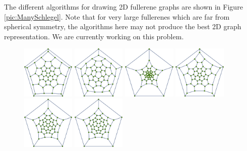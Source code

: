 \documentclass[article,a4paper,twoside]{memoir}
\begin{document}
The different algorithms for drawing 2D fullerene graphs are shown in Figure \ref{pic:ManySchlegel}. Note that for very large
fullerenes which are far from spherical symmetry, the algorithms here may not produce the best 2D graph representation.
We are currently working on this problem.

 \begin{figure}[htbp]
	\centering
  		 \includegraphics[width=0.225\textwidth]{Graph1.png}
		 \includegraphics[width=0.225\textwidth]{Graph2.png}
		 \includegraphics[width=0.225\textwidth]{Graph3.png}
		 \includegraphics[width=0.225\textwidth]{Graph4.png}
		 \includegraphics[width=0.225\textwidth]{Graph5.png}
		 \includegraphics[width=0.225\textwidth]{Graph6.png}

\end{figure}
\end{document}

